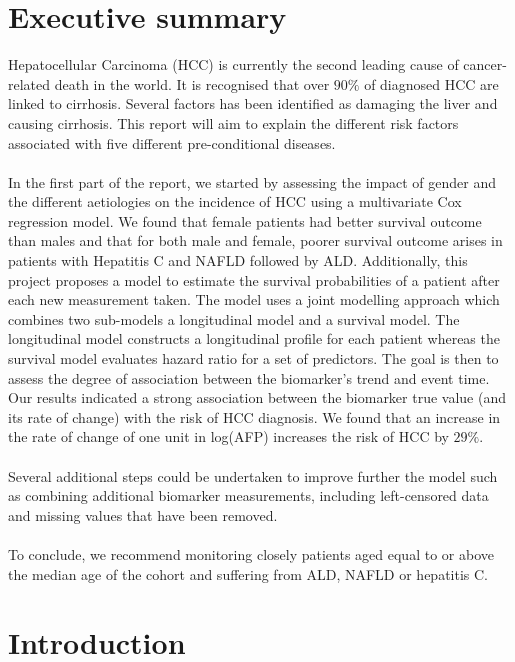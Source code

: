 \documentclass[11pt,twoside]{article}
\numberwithin{Theorem}{section}
\numberwithin{Definition}{section}
\numberwithin{Lemma}{section}
\numberwithin{Algorithm}{section}
\numberwithin{equation}{section}
\begin{document}
\section*{Executive summary}

Hepatocellular Carcinoma (HCC) is currently the second leading cause of cancer-related death in the world. It is recognised that over $90\%$ of diagnosed HCC are linked to cirrhosis. Several factors has been identified as damaging the liver and causing cirrhosis. This report will aim to explain the different risk factors associated with five different pre-conditional diseases.\\ \\
%
%
In the first part of the report, we started by assessing the impact of gender and the different aetiologies on the incidence of HCC using a multivariate Cox regression model. We found that female patients had better survival outcome than males and that for both male and female, poorer survival outcome arises in patients with Hepatitis C and NAFLD followed by ALD.
%
%
Additionally, this project proposes a model to estimate the survival probabilities of a patient after each new measurement taken. The model uses a joint modelling approach which combines two sub-models a longitudinal model and a survival model. The longitudinal model constructs a longitudinal profile for each patient whereas the survival model evaluates hazard ratio for a set of predictors. The goal is then to assess the degree of association between the biomarker's trend and event time.
Our results indicated a strong association between the biomarker true value (and its rate of change) with the risk of HCC diagnosis. We found that an increase in the rate of change of one unit in log(AFP) increases the risk of HCC by $29\%$.
\\ \\
Several additional steps could be undertaken to improve further the model such as combining additional biomarker measurements, including left-censored data and missing values that have been removed.
\\ \\
To conclude, we  recommend  monitoring  closely  patients  aged  equal  to  or  above  the  median age of the cohort and suffering from ALD, NAFLD or hepatitis C.
%
%
\clearpage
\tableofcontents
%
%
\clearpage
%
\section{Introduction}
\label{sec.intro}
\end{document}
